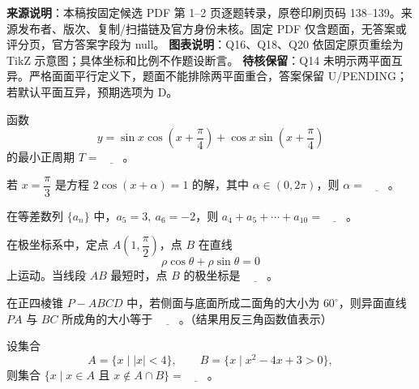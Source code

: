 

\begin{gktip}
\textbf{来源说明}：本稿按固定候选 PDF 第 1–2 页逐题转录，原卷印刷页码 138–139。来源发布者、版次、复制/扫描链及官方身份未核。固定 PDF 仅含题面，无答案或评分页，官方答案字段为 null。
\textbf{图表说明}：Q16、Q18、Q20 依固定原页重绘为 TikZ 示意图；具体坐标和比例不作题设断言。
\textbf{待核保留}：Q14 未明示两平面互异。严格面面平行定义下，题面不能排除两平面重合，答案保留 U/PENDING；若默认平面互异，预期选项为 D。
\end{gktip}


\begin{question}
函数
\nopagebreak[4]
\[
   y=\sin x\cos\left(x+\frac{\pi}{4}\right)+\cos x\sin\left(x+\frac{\pi}{4}\right)
\]
   的最小正周期 \(T=\underline{\qquad}\)。

\end{question}
\begin{question}
若 \(x=\dfrac{\pi}{3}\) 是方程 \(2\cos(x+\alpha)=1\) 的解，其中 \(\alpha\in(0,2\pi)\)，则 \(\alpha=\underline{\qquad}\)。

\end{question}
\begin{question}
在等差数列 \(\{a_n\}\) 中，\(a_5=3,\ a_6=-2\)，则 \(a_4+a_5+\cdots+a_{10}=\underline{\qquad}\)。

\end{question}
\begin{question}
在极坐标系中，定点 \(A\left(1,\dfrac{\pi}{2}\right)\)，点 \(B\) 在直线
\nopagebreak[4]
\[
   \rho\cos\theta+\rho\sin\theta=0
\]
   上运动。当线段 \(AB\) 最短时，点 \(B\) 的极坐标是 \(\underline{\qquad}\)。

\end{question}
\begin{question}
在正四棱锥 \(P-ABCD\) 中，若侧面与底面所成二面角的大小为 \(60^\circ\)，则异面直线 \(PA\) 与 \(BC\) 所成角的大小等于 \(\underline{\qquad}\)。（结果用反三角函数值表示）

\end{question}
\begin{question}
设集合
\nopagebreak[4]
\[
   A=\{x\mid |x|<4\},\qquad B=\{x\mid x^2-4x+3>0\},
\]
   则集合 \(\{x\mid x\in A\text{ 且 }x\notin A\cap B\}=\underline{\qquad}\)。

\end{question}
